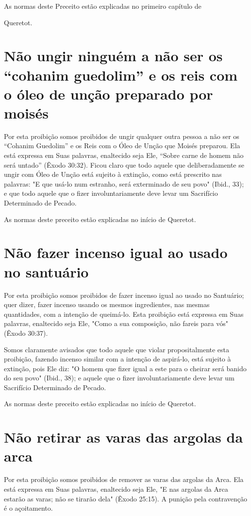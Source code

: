 As normas deste Preceito estão explicadas no primeiro capítulo de


Queretot.


\section{Não ungir ninguém a não ser os ``cohanim guedolim'' e os reis 
com o óleo de unção preparado por moisés}

Por esta proibição somos proibidos de ungir qualquer outra pessoa a não
ser os ``Cohanim Guedolim'' e os Reis com o Óleo de Unção que Moisés
preparou. Ela está expressa em Suas palavras, enaltecido seja Ele,
``Sobre carne de homem não será untado'' (Êxodo 30:32). Ficou claro que
todo aquele que deliberadamente se ungir com Óleo de Unção está sujeito
à extinção, como es­tá prescrito nas palavras: "E que usá-lo num
estranho, será exterminado de seu povo" (Ibid., 33); e que todo aquele
que o fizer involuntariamente deve levar um Sacrifício Determinado de
Pecado.


As normas deste preceito estão explicadas no início de Queretot.


\section{Não fazer incenso igual ao usado no santuário}

Por esta proibição somos proibidos de fazer incenso igual ao usado no
Santuário; quer dizer, fazer incenso usando os mesmos ingredientes, nas
mes­mas quantidades, com a intenção de queimá-lo. Esta proibição está
expressa em Suas palavras, enaltecido seja Ele, "Como a sua composição,
não fareis para vós" (Êxodo 30:37).

Somos claramente avisados que todo aquele que violar proposital­mente
esta proibição, fazendo incenso similar com a intenção de aspirá-lo,
está sujeito à extinção, pois Ele diz: "O homem que fizer igual a este
para o cheirar será banido do seu povo" (Ibid., 38); e aquele que o
fizer involuntariamente deve levar um Sacrifício Determinado de Pecado.


As normas deste preceito estão explicadas no início de Queretot.


\section{Não retirar as varas das argolas da arca}

Por esta proibição somos proibidos de remover as varas das argolas da
Arca. Ela está expressa em Suas palavras, enaltecido seja Ele, "E nas
argolas da Arca estarão as varas; não se tirarão dela" (Êxodo 25:15). A
punição pela con­travenção é o açoitamento.

